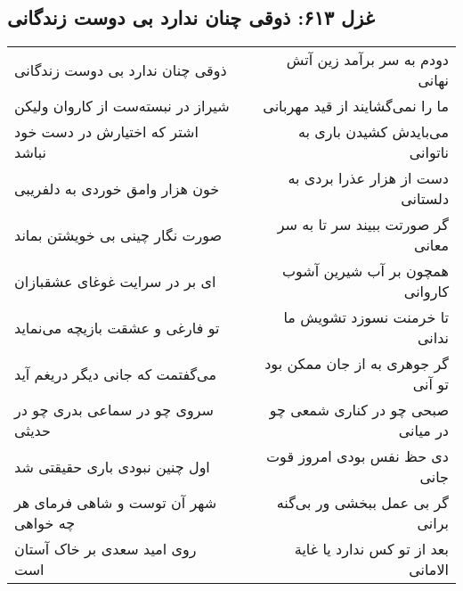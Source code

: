 \begin{center}
\section*{غزل ۶۱۳: ذوقی چنان ندارد بی دوست زندگانی}
\label{sec:613}
\begin{longtable}{l p{0.5cm} r}
ذوقی چنان ندارد بی دوست زندگانی
&&
دودم به سر برآمد زین آتش نهانی
\\
شیراز در نبسته‌ست از کاروان ولیکن
&&
ما را نمی‌گشایند از قید مهربانی
\\
اشتر که اختیارش در دست خود نباشد
&&
می‌بایدش کشیدن باری به ناتوانی
\\
خون هزار وامق خوردی به دلفریبی
&&
دست از هزار عذرا بردی به دلستانی
\\
صورت نگار چینی بی خویشتن بماند
&&
گر صورتت ببیند سر تا به سر معانی
\\
ای بر در سرایت غوغای عشقبازان
&&
همچون بر آب شیرین آشوب کاروانی
\\
تو فارغی و عشقت بازیچه می‌نماید
&&
تا خرمنت نسوزد تشویش ما ندانی
\\
می‌گفتمت که جانی دیگر دریغم آید
&&
گر جوهری به از جان ممکن بود تو آنی
\\
سروی چو در سماعی بدری چو در حدیثی
&&
صبحی چو در کناری شمعی چو در میانی
\\
اول چنین نبودی باری حقیقتی شد
&&
دی حظ نفس بودی امروز قوت جانی
\\
شهر آن توست و شاهی فرمای هر چه خواهی
&&
گر بی عمل ببخشی ور بی‌گنه برانی
\\
روی امید سعدی بر خاک آستان است
&&
بعد از تو کس ندارد یا غایة الامانی
\\
\end{longtable}
\end{center}

